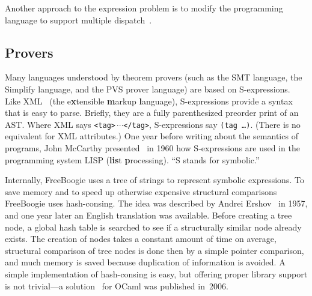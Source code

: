 \documentclass{llncs}
\def\fb#1{{\bf #1}} %
\begin{document}
Another approach to the expression problem is to
modify the programming language to support multiple
dispatch~\cite{chambers1994mm,clifton2006}.

\subsection{Provers}

Many languages understood by theorem provers (such as the SMT
language, the Simplify language, and the PVS prover language)
are based on S-expressions. Like XML~\cite{bray2006xml} (the
e\textbf{x}tensible \fb markup \fb language), S-expressions
provide a syntax that is easy to parse. Briefly, they are a fully
parenthesized preorder print of an AST\null. Where XML says
\texttt{<tag>$\,\cdots$</tag>}, S-expressions say \texttt{(tag
\dots)}. (There is no equivalent for XML attributes.) One year
before writing about the semantics of programs, John McCarthy
presented~\cite{mccarthy1960} in 1960 how S-expressions are used
in the programming system LISP (\textbf{lis}t \fb processing).
``S stands for symbolic.''

Internally, FreeBoogie uses a tree of strings to represent
symbolic expressions. To save memory and to speed up otherwise
expensive structural comparisons FreeBoogie uses hash-consing.
The idea was described by Andrei Ershov~\cite{ershov1958} in
1957, and one year later an English translation was available.
Before creating a tree node, a global hash table is searched to
see if a structurally similar node already exists. The creation
of nodes takes a constant amount of time on average, structural
comparison of tree nodes is done then by a simple pointer
comparison, and much memory is saved because duplication of
information is avoided. A simple implementation of hash-consing
is easy, but offering proper library support is not trivial---a
solution~\cite{filliatre2006hash} for OCaml was published
in~2006.
\end{document}
